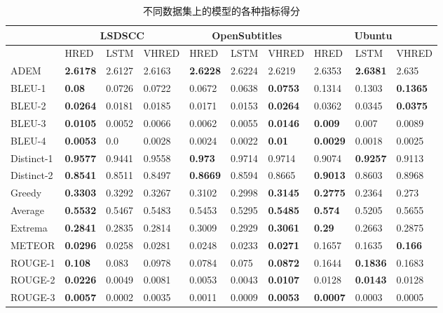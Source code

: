 \begin{table}[H]%
    \centering%
    \caption{不同数据集上的模型的各种指标得分}%
    \label{tab:systemScoresAll}%
    \setlength{\tabcolsep}{0.11cm}%
    \begin{tabular}{@{}llllllllll@{}}%
        \toprule%
        \midrule%
        &\multicolumn{3}{c}{LSDSCC}&\multicolumn{3}{c}{OpenSubtitles}&\multicolumn{3}{c}{Ubuntu}\\%
        \midrule%
        &HRED&LSTM&VHRED&HRED&LSTM&VHRED&HRED&LSTM&VHRED\\%
        \midrule%
        ADEM&\textbf{2.6178}&2.6127&2.6163&\textbf{2.6228}&2.6224&2.6219&2.6353&\textbf{2.6381}&2.635\\%
        BLEU{-}1&\textbf{0.08}&0.0726&0.0722&0.0672&0.0638&\textbf{0.0753}&0.1314&0.1303&\textbf{0.1365}\\%
        BLEU{-}2&\textbf{0.0264}&0.0181&0.0185&0.0171&0.0153&\textbf{0.0264}&0.0362&0.0345&\textbf{0.0375}\\%
        BLEU{-}3&\textbf{0.0105}&0.0052&0.0066&0.0062&0.0055&\textbf{0.0146}&\textbf{0.009}&0.007&0.0089\\%
        BLEU{-}4&\textbf{0.0053}&0.0&0.0028&0.0024&0.0022&\textbf{0.01}&\textbf{0.0029}&0.0018&0.0025\\%
        Distinct{-}1&\textbf{0.9577}&0.9441&0.9558&\textbf{0.973}&0.9714&0.9714&0.9074&\textbf{0.9257}&0.9113\\%
        Distinct{-}2&\textbf{0.8541}&0.8511&0.8497&\textbf{0.8669}&0.8594&0.8665&\textbf{0.9013}&0.8603&0.8968\\%
        Greedy&\textbf{0.3303}&0.3292&0.3267&0.3102&0.2998&\textbf{0.3145}&\textbf{0.2775}&0.2364&0.273\\%
        Average&\textbf{0.5532}&0.5467&0.5483&0.5453&0.5295&\textbf{0.5485}&\textbf{0.574}&0.5205&0.5655\\%
        Extrema&\textbf{0.2841}&0.2835&0.2814&0.3009&0.2929&\textbf{0.3061}&\textbf{0.29}&0.2663&0.2875\\%
        METEOR&\textbf{0.0296}&0.0258&0.0281&0.0248&0.0233&\textbf{0.0271}&0.1657&0.1635&\textbf{0.166}\\%
        ROUGE{-}1&\textbf{0.108}&0.083&0.0978&0.0784&0.075&\textbf{0.0872}&0.1644&\textbf{0.1836}&0.1683\\%
        ROUGE{-}2&\textbf{0.0226}&0.0049&0.0081&0.0053&0.0043&\textbf{0.0107}&0.0128&\textbf{0.0143}&0.0128\\%
        ROUGE{-}3&\textbf{0.0057}&0.0002&0.0035&0.0011&0.0009&\textbf{0.0053}&\textbf{0.0007}&0.0003&0.0005\\%

\end{tabular}
\end{table}
